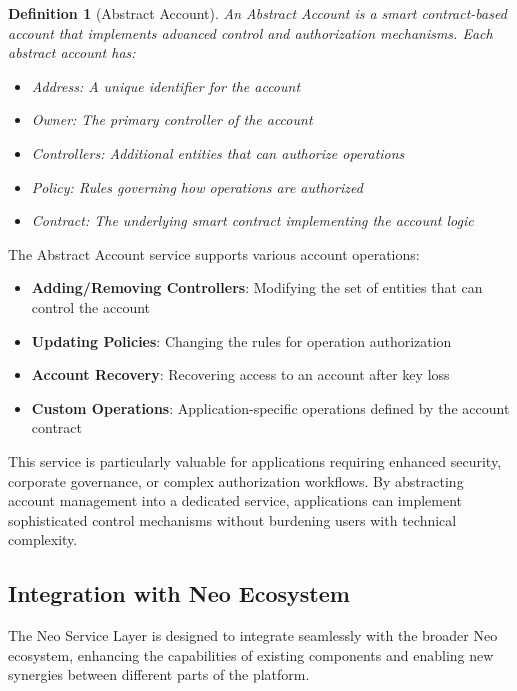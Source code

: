 \documentclass{article}
\newtheorem{definition}{Definition}
\begin{document}
\begin{definition}[Abstract Account]
An Abstract Account is a smart contract-based account that implements advanced control and authorization mechanisms. Each abstract account has:
\begin{itemize}
    \item Address: A unique identifier for the account
    \item Owner: The primary controller of the account
    \item Controllers: Additional entities that can authorize operations
    \item Policy: Rules governing how operations are authorized
    \item Contract: The underlying smart contract implementing the account logic
\end{itemize}
\end{definition}

The Abstract Account service supports various account operations:

\begin{itemize}
    \item \textbf{Adding/Removing Controllers}: Modifying the set of entities that can control the account
    \item \textbf{Updating Policies}: Changing the rules for operation authorization
    \item \textbf{Account Recovery}: Recovering access to an account after key loss
    \item \textbf{Custom Operations}: Application-specific operations defined by the account contract
\end{itemize}

This service is particularly valuable for applications requiring enhanced security, corporate governance, or complex authorization workflows. By abstracting account management into a dedicated service, applications can implement sophisticated control mechanisms without burdening users with technical complexity.

\subsection{Integration with Neo Ecosystem}
\label{subsec:nsl-integration}

The Neo Service Layer is designed to integrate seamlessly with the broader Neo ecosystem, enhancing the capabilities of existing components and enabling new synergies between different parts of the platform.
\end{document}

